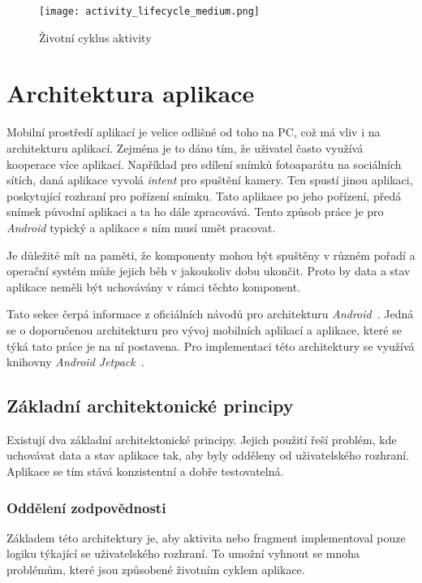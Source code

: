 \begin{figure}[h!]
    \centering
    \vspace{0.5cm}
    \texttt{[image: activity\_lifecycle\_medium.png]}
    \caption[Životní cyklus aktivity]{Životní cyklus aktivity~\cite{activity-life-cycle}}
    \label{diagram:activity_lifecycle}
\end{figure}

\newpage
\section{Architektura aplikace}
 Mobilní prostředí aplikací je velice odlišné od toho na PC, což má vliv i na architekturu aplikací. Zejména je to dáno tím, že uživatel často využívá kooperace více aplikací. Například pro sdílení snímků fotoaparátu na sociálních sítích, daná aplikace vyvolá \emph{intent} pro spuštění kamery. Ten spustí jinou aplikaci, poskytující rozhraní pro pořízení snímku. Tato aplikace po jeho pořízení, předá snímek původní aplikaci a ta ho dále zpracovává. Tento způsob práce je pro \emph{Android} typický a aplikace s ním musí umět pracovat.

 Je důležité mít na paměti, že komponenty mohou být spuštěny v různém pořadí a operační systém může jejich běh v jakoukoliv dobu ukončit. Proto by data a stav aplikace neměli být uchovávány v rámci těchto komponent.
 
 Tato sekce čerpá informace z oficiálních návodů pro architekturu \emph{Android}~. Jedná se o doporučenou architekturu pro vývoj mobilních aplikací a aplikace, které se týká tato práce je na ní postavena. Pro implementaci této architektury se využívá knihovny \emph{Android Jetpack}~.

    \subsection{Základní architektonické principy}
    Existují dva základní architektonické principy. Jejich použití řeší problém, kde uchovávat data a stav aplikace tak, aby byly odděleny od uživatelského rozhraní. Aplikace se tím stává konzistentní a dobře testovatelná.

        \subsubsection{Oddělení zodpovědnosti}
        Základem této architektury je, aby aktivita nebo fragment implementoval pouze logiku týkající se uživatelského rozhraní. To umožní vyhnout se mnoha problémům, které jsou způsobené životním cyklem aplikace.


